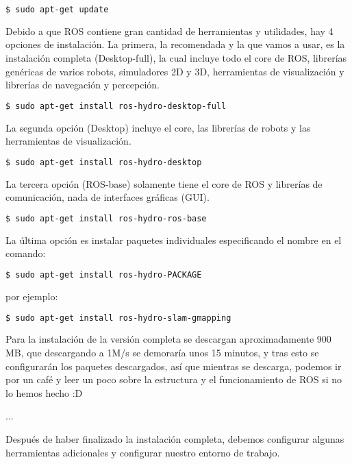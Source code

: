 \begin{lstlisting}[language = bash]
$ sudo apt-get update
\end{lstlisting}

Debido a que ROS contiene gran cantidad de herramientas y utilidades, hay 4 opciones de instalación. La primera, la recomendada y la que vamos a usar, es la instalación completa (Desktop-full), la cual incluye todo el core de ROS, librerías genéricas de varios robots, simuladores 2D y 3D, herramientas de visualización y librerías de navegación y percepción.

\begin{lstlisting}[language = bash]
$ sudo apt-get install ros-hydro-desktop-full
\end{lstlisting}

La segunda opción (Desktop) incluye el core, las librerías de robots y las herramientas de visualización. 

\begin{lstlisting}[language = bash]
$ sudo apt-get install ros-hydro-desktop
\end{lstlisting}

La tercera opción (ROS-base) solamente tiene el core de ROS y librerías de comunicación, nada de interfaces gráficas (GUI). 

\begin{lstlisting}[language = bash]
$ sudo apt-get install ros-hydro-ros-base
\end{lstlisting}

La última opción es instalar paquetes individuales especificando el nombre en el comando:

\begin{lstlisting}[language = bash]
$ sudo apt-get install ros-hydro-PACKAGE
\end{lstlisting}

por ejemplo:

\begin{lstlisting}[language = bash]
$ sudo apt-get install ros-hydro-slam-gmapping
\end{lstlisting}

Para la  instalación de la versión completa se descargan aproximadamente 900 MB, que descargando a 1M/s se demoraría unos 15 minutos, y tras esto se configurarán los paquetes descargados, así que mientras se descarga, podemos ir por un café y leer un poco sobre la estructura y el funcionamiento de ROS si no lo hemos hecho :D

...

Después de haber finalizado la instalación completa, debemos configurar algunas herramientas adicionales y configurar nuestro entorno de trabajo.


